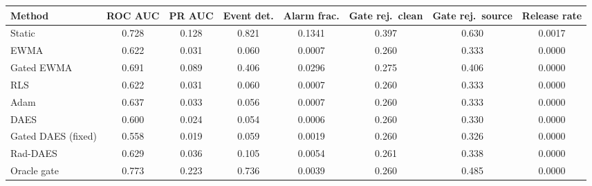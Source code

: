 \begin{tabular}{lccccccc}
\toprule
Method & ROC AUC & PR AUC & Event det. & Alarm frac. & Gate rej.\ clean & Gate rej.\ source & Release rate \\
\midrule
Static & 0.728 & 0.128 & 0.821 & 0.1341 & 0.397 & 0.630 & 0.0017 \\
EWMA & 0.622 & 0.031 & 0.060 & 0.0007 & 0.260 & 0.333 & 0.0000 \\
Gated EWMA & 0.691 & 0.089 & 0.406 & 0.0296 & 0.275 & 0.406 & 0.0000 \\
RLS & 0.622 & 0.031 & 0.060 & 0.0007 & 0.260 & 0.333 & 0.0000 \\
Adam & 0.637 & 0.033 & 0.056 & 0.0007 & 0.260 & 0.333 & 0.0000 \\
DAES & 0.600 & 0.024 & 0.054 & 0.0006 & 0.260 & 0.330 & 0.0000 \\
Gated DAES (fixed) & 0.558 & 0.019 & 0.059 & 0.0019 & 0.260 & 0.326 & 0.0000 \\
Rad-DAES & 0.629 & 0.036 & 0.105 & 0.0054 & 0.261 & 0.338 & 0.0000 \\
Oracle gate & 0.773 & 0.223 & 0.736 & 0.0039 & 0.260 & 0.485 & 0.0000 \\
\bottomrule
\end{tabular}
